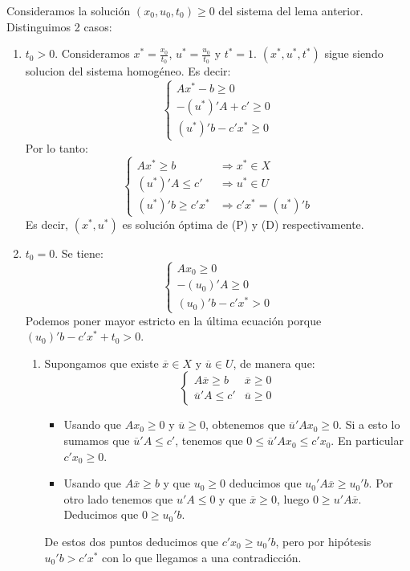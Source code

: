 \documentclass[PM.tex]{subfiles}
\begin{document}
\begin{dem} Consideramos la solución $(x_0,u_0,t_0)\geq 0$ del sistema del lema anterior. Distinguimos 2 casos:
\begin{enumerate}
	\item $t_0 > 0$. Consideramos $x^* = \frac{x_0}{t_0}$, $u^* = \frac{u_0}{t_0}$ y $t^* = 1$. $(x^*,u^*,t^*)$ sigue siendo solucion del sistema homogéneo. Es decir:
\[\begin{cases}
	Ax^* - b ≥ 0\\
	-(u^*)'A + c' ≥ 0\\
	(u^*)'b - c'x^* ≥ 0
\end{cases}\]
Por lo tanto:
\[\begin{cases}
	Ax^* ≥ b & \Rightarrow x^* \in X\\
	(u^*)'A ≤ c' & \Rightarrow u^* \in U\\
	(u^*)'b ≥ c'x^* & \Rightarrow c'x^* = (u^*)'b
\end{cases}\]
Es decir, $(x^*,u^*)$ es solución óptima de (P) y (D) respectivamente.
	\item $t_0=0$. Se tiene:
\[\begin{cases}
	Ax_0 ≥ 0\\
	-(u_0)'A  ≥ 0\\
	(u_0)'b - c'x^* > 0
\end{cases}\]
	Podemos poner mayor estricto en la última ecuación porque $(u_0)'b-c'x^*+t_0 > 0$.
	\begin{enumerate}
	\item Supongamos que existe $\overline{x} \in X$ y $\overline{u} \in U$, de manera que:
	\[\begin{cases}
		A\overline{x} ≥ b & \overline{x} ≥ 0\\
		\overline{u}'A ≤ c' & \overline{u} ≥ 0
	\end{cases}\]
	\begin{itemize}
	\item Usando que $Ax_0 ≥ 0$ y $\overline{u} ≥ 0$, obtenemos que $\overline{u}'Ax_0≥0$. Si a esto lo sumamos que $\overline{u}'A ≤ c'$, tenemos que $0\leq\overline{u}'Ax_0≤c'x_0 $. En particular $c'x_0 ≥ 0$.
	\item  Usando que $A\overline{x} ≥ b$ y que $u_0 ≥ 0$ deducimos que $u_0'A\overline{x}≥u_0'b $. Por otro lado tenemos que $u'A ≤ 0$ y que $\overline{x} ≥ 0$, luego $0\geq u'A\overline{x}$. Deducimos que $0 \geq u_0'b$.
\end{itemize}
 De estos dos puntos deducimos que $c'x_0  \geq u_0'b$, pero por hipótesis $u_0'b >  c'x^*$ con lo que llegamos a una contradicción.

\end{enumerate}
\end{enumerate}
\end{dem}
\end{document}
